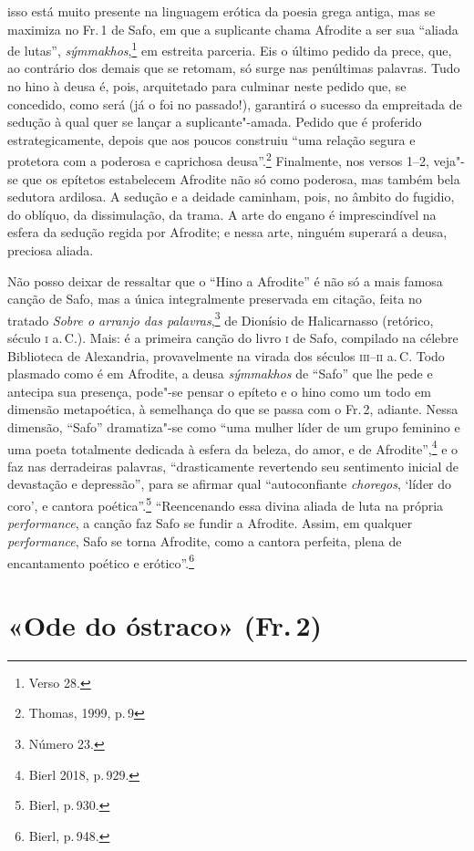 isso está muito presente na linguagem erótica da poesia grega antiga, mas se
maximiza no Fr.\,1 de Safo, em que a suplicante chama Afrodite a ser sua
``aliada de lutas'', \emph{sýmmakhos},\footnote{Verso 28.} em estreita parceria. Eis o último pedido da prece, que, ao contrário dos demais que se retomam, só surge nas penúltimas palavras. Tudo no hino à deusa é, pois, arquitetado para culminar neste pedido que, se concedido, como será (já o foi no passado!), garantirá o sucesso da empreitada de sedução à qual quer se lançar a suplicante"-amada. Pedido que é proferido estrategicamente, depois que aos poucos construiu ``uma relação segura e protetora com a poderosa e caprichosa deusa''.\footnote{Thomas, 1999, p.\,9} Finalmente, nos versos 1--2, veja"-se
que os epítetos estabelecem Afrodite não só como poderosa, mas também bela
sedutora ardilosa. A sedução e a deidade caminham, pois, no âmbito do fugidio,
do oblíquo, da dissimulação, da trama. A arte do engano é imprescindível na
esfera da sedução regida por Afrodite; e nessa arte, ninguém superará a deusa,
preciosa aliada.

Não posso deixar de ressaltar que o ``Hino a Afrodite'' é não só
a mais famosa canção de Safo, mas a única integralmente preservada em citação, feita no tratado \emph{Sobre o arranjo das palavras},\footnote{Número 23.} de Dionísio de Halicarnasso (retórico, século \textsc{i} a.\,C.). Mais: é a primeira canção do livro \textsc{i} de Safo,
compilado na célebre Biblioteca de Alexandria, provavelmente na virada dos
séculos \textsc{iii}--\textsc{ii} a.\,C.
Todo plasmado como é em Afrodite, a deusa \emph{sýmmakhos} de ``Safo'' que lhe pede e antecipa sua presença, pode"-se pensar o epíteto e o hino como um todo em dimensão metapoética, à semelhança do que se passa com o Fr.\,2, adiante. Nessa dimensão, ``Safo'' dramatiza"-se como ``uma mulher líder de um grupo feminino e uma poeta totalmente dedicada à esfera da beleza, do amor, e de Afrodite'',\footnote{Bierl 2018, p.\,929.} e o faz nas derradeiras palavras, ``drasticamente revertendo seu sentimento inicial de devastação e depressão'', para se afirmar qual ``autoconfiante \emph{choregos}, ‘líder do coro’, e cantora poética''.\footnote{Bierl, p.\,930.} ``Reencenando essa divina aliada de luta na própria \emph{performance}, a canção faz Safo se fundir a Afrodite. Assim, em qualquer \emph{performance}, Safo se torna Afrodite, como a cantora perfeita, plena de encantamento poético e erótico''.\footnote{Bierl, p.\,948.}

\section{«Ode do óstraco» (Fr.\,2)}

